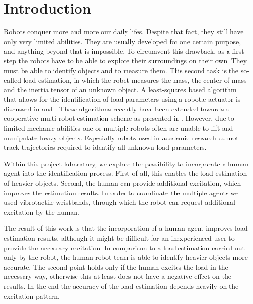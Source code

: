 \chapter{Introduction}
Robots conquer more and more our daily lifes. Despite that fact, they still have only very limited abilities. They are usually developed for one certain purpose, and anything beyond that is impossible. To circumvent this drawback, as a first step the robots have to be able to explore their surroundings on their own. They must be able to identify objects and to measure them. This second task is the so-called load estimation, in which the robot measures the mass, the center of mass and the inertia tensor of an unknown object. A least-squares based algorithm that allows for the identification of load parameters using a robotic actuator is discussed in \cite{literaturstelle1} and \cite{literaturstelle2}. These algorithms recently have been extended towards a cooperative multi-robot estimation scheme as presented in \cite{literaturstelle3}. However, due to limited mechanic abilities one or multiple robots often are unable to lift and manipulate heavy objects. Especially robots used in academic research cannot track trajectories required to identify all unknown load parameters.

Within this project-laboratory, we explore the possibility to incorporate a human agent into the identification process. First of all, this enables the load estimation of heavier objects. Second, the human can provide additional excitation, which improves the estimation results. In order to coordinate the multiple agents we used vibrotactile wristbands, through which the robot can request additional excitation by the human.

The result of this work is that the incorporation of a human agent improves load estimation results, although it might be difficult for an inexperienced user to provide the necessary excitation. In comparison to a load estimation carried out only by the robot, the human-robot-team is able to identify heavier objects more accurate. The second point holds only if the human excites the load in the necessary way, otherwise this at least does not have a negative effect on the results. In the end the accuracy of the load estimation depends heavily on the excitation pattern.